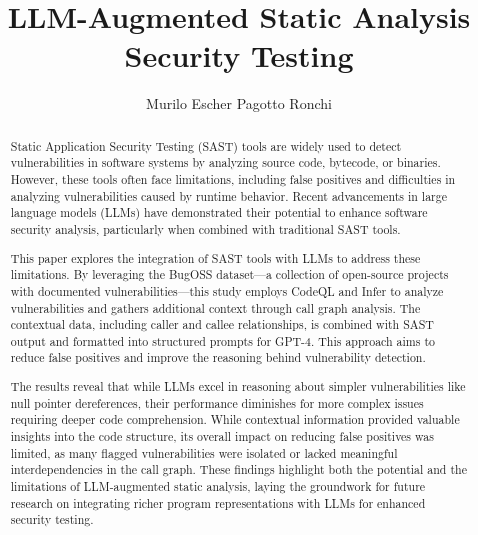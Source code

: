 \documentclass[runningheads]{llncs}
\begin{document}
%
\title{LLM-Augmented Static Analysis Security Testing}
%
%
%
\author{Murilo Escher Pagotto Ronchi}
%
\maketitle %
%
%
\begin{abstract}
Static Application Security Testing (SAST) tools are widely used to detect vulnerabilities in software systems by analyzing source code, bytecode, or binaries. However, these tools often face limitations, including false positives and difficulties in analyzing vulnerabilities caused by runtime behavior. Recent advancements in large language models (LLMs) have demonstrated their potential to enhance software security analysis, particularly when combined with traditional SAST tools.

This paper explores the integration of SAST tools with LLMs to address these limitations. By leveraging the BugOSS dataset—a collection of open-source projects with documented vulnerabilities—this study employs CodeQL and Infer to analyze vulnerabilities and gathers additional context through call graph analysis. The contextual data, including caller and callee relationships, is combined with SAST output and formatted into structured prompts for GPT-4. This approach aims to reduce false positives and improve the reasoning behind vulnerability detection.

The results reveal that while LLMs excel in reasoning about simpler vulnerabilities like null pointer dereferences, their performance diminishes for more complex issues requiring deeper code comprehension. While contextual information provided valuable insights into the code structure, its overall impact on reducing false positives was limited, as many flagged vulnerabilities were isolated or lacked meaningful interdependencies in the call graph. These findings highlight both the potential and the limitations of LLM-augmented static analysis, laying the groundwork for future research on integrating richer program representations with LLMs for enhanced security testing.

\end{abstract}
%
%





%
%
\appendix
% 
%
%


%
\end{document}
